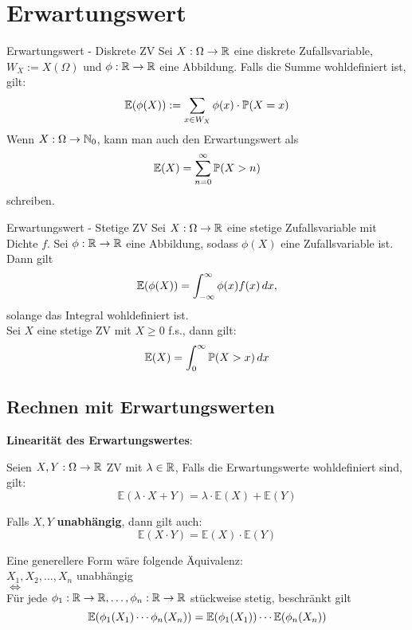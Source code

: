 \section{Erwartungswert}
\begin{mainbox}{Erwartungswert - Diskrete ZV}
    Sei $X: \Omega \to \R$ eine diskrete Zufallsvariable, $W_X := X(\Omega)$ und $\phi: \R \to \R$ eine Abbildung. Falls die Summe wohldefiniert ist, gilt: 
    $$\mathbb{E}(\phi(X)) := \sum_{x \in W_X} \phi(x) \cdot \P(X = x)$$
    Wenn $X: \Omega \to \N_0$, kann man auch den Erwartungswert als
    $$\mathbb{E}(X) = \sum_{n = 0}^{\infty}\P(X > n)$$
    schreiben.
\end{mainbox}
\begin{mainbox}{Erwartungswert - Stetige ZV}
    Sei $X: \Omega \to \R$ eine stetige Zufallsvariable mit Dichte $f$. Sei $\phi: \R \to \R$ eine Abbildung, sodass $\phi(X)$ eine Zufallsvariable ist. Dann gilt
    $$\mathbb{E}(\phi(X))= \int_{-\infty}^\infty \phi(x)f(x)\dx,$$
    solange das Integral wohldefiniert ist.
    \\Sei $X$ eine stetige ZV mit $X \geq 0$ f.s., dann gilt:
    $$\E(X)=\int_0^\infty \P(X > x)\dx$$ 
\end{mainbox}

\subsection{Rechnen mit Erwartungswerten}
\textbf{Linearität des Erwartungswertes}: 

Seien $X, Y: \Omega \to \R$ ZV mit $\lambda \in \R$, Falls die Erwartungswerte wohldefiniert sind, gilt:
$$\mathbb{E}(\lambda \cdot X + Y) = \lambda \cdot \mathbb{E}(X) + \mathbb{E}(Y)$$

Falls $X, Y$ \textbf{unabhängig}, dann gilt auch:
$$\mathbb{E}(X \cdot Y) = \mathbb{E}(X) \cdot \mathbb{E}(Y)$$

Eine generellere Form wäre folgende Äquivalenz:\\
$X_1, X_2, ...,X_n$ unabhängig
\\$\iff$
\\Für jede $\phi_1: \R \to \R, \ldots, \phi_n: \R \to \R$ stückweise stetig, beschränkt gilt
$$\E(\phi_1(X_1)\cdots\phi_n(X_n))=\E(\phi_1(X_1))\cdots\E(\phi_n(X_n))$$ 

